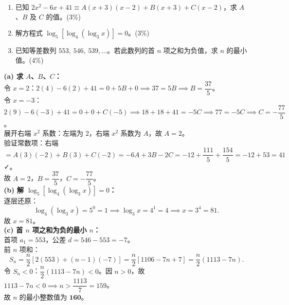 \documentclass[12pt,a4paper]{exam-zh}
\begin{document}
\begin{question}
    \begin{enumerate}[label=(\alph*)]
        \item 已知 $2x^2 - 6x + 41 \equiv A(x+3)(x-2) + B(x+3) + C(x-2)$，求 $A$、$B$ 及 $C$ 的值。\hfill(3\%)
        \item 解方程式 $\log_5[\log_4(\log_3 x)] = 0$。\hfill(3\%)
        \item 已知等差数列 $553,\ 546,\ 539,\ldots$。若此数列的首 $n$ 项之和为负值，求 $n$ 的最小值。\hfill(4\%)
    \end{enumerate}
\end{question}

\begin{solution}
    \textbf{(a) 求 $A$、$B$、$C$：} \\
    令 $x = 2$：$2(4) - 6(2) + 41 = 0 + 5B + 0 \implies 37 = 5B \implies B = \dfrac{37}{5}$。\\
    令 $x = -3$：$2(9) - 6(-3) + 41 = 0 + 0 + C(-5) \implies 18+18+41 = -5C \implies 77 = -5C \implies C = -\dfrac{77}{5}$。\\
    展开右端 $x^2$ 系数：左端为 $2$，右端 $x^2$ 系数为 $A$，故 $A = 2$。\\
    验证常数项：右端 $= A(3)(-2) + B(3) + C(-2) = -6A + 3B - 2C = -12 + \dfrac{111}{5} + \dfrac{154}{5} = -12 + 53 = 41$ ✓。\\
    故 $A = 2$，$B = \dfrac{37}{5}$，$C = -\dfrac{77}{5}$。\\

    \textbf{(b) 解 $\log_5[\log_4(\log_3 x)] = 0$：} \\
    逐层还原：
    \[
        \log_4(\log_3 x) = 5^0 = 1
        \implies \log_3 x = 4^1 = 4
        \implies x = 3^4 = 81.
    \]
    故 $x = 81$。\\

    \textbf{(c) 首 $n$ 项之和为负的最小 $n$：} \\
    首项 $a_1 = 553$，公差 $d = 546 - 553 = -7$。\\
    前 $n$ 项和：
    \[
        S_n = \frac{n}{2}[2(553) + (n-1)(-7)] = \frac{n}{2}[1106 - 7n + 7] = \frac{n}{2}(1113 - 7n).
    \]
    令 $S_n < 0$：$\dfrac{n}{2}(1113 - 7n) < 0$。因 $n > 0$，故 $1113 - 7n < 0 \implies n > \dfrac{1113}{7} = 159$。\\
    故 $n$ 的最小整数值为 $\mathbf{160}$。
\end{solution}
\end{document}
